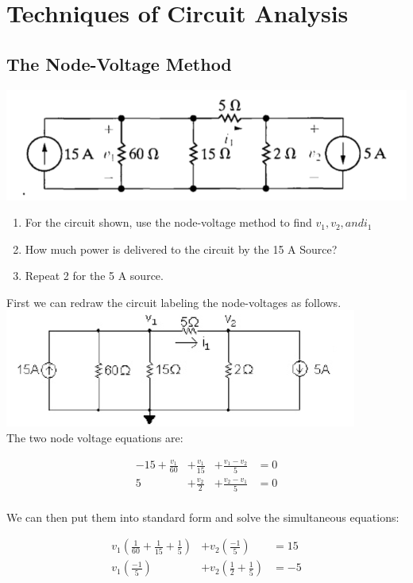 \section{Techniques of Circuit Analysis}

\subsection{The Node-Voltage Method}
\includegraphics[scale=0.5]{img/c4/p1} \\

\begin{enumerate}
	\item For the circuit shown, use the node-voltage method to find $v_1,v_2, and i_1$
	\item How much power is delivered to the circuit by the 15 A Source?
	\item Repeat 2 for the 5 A source. 
\end{enumerate}

First we can redraw the circuit labeling the node-voltages as follows. 
\includegraphics[scale=0.5]{img/c4/a1} \\

The two node voltage equations are:

\begin{align*}
-15 + \frac{v_1}{60} &+  \frac{v_1}{15} &+ \frac{v_1-v_2}{5} &= 0 \\
5 &+ \frac{v_2}{2} &+ \frac{v_2 - v_1}{5} &= 0  \\
\end{align*}

We can then put them into standard form and solve the simultaneous equations:

\begin{align*}
v_1\left(\frac{1}{60} + \frac{1}{15} + \frac{1}{5}\right) &+ v_2(\frac{-1}{5}) &= 15 \\
v_1\left(\frac{-1}{5}\right) &+ v_2\left(\frac{1}{2} + \frac{1}{5}\right) &= -5 \\
\end{align*}

